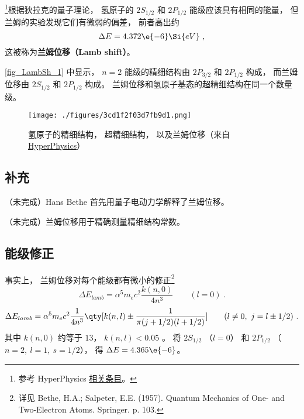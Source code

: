 
\begin{issues}
\issueDraft
\issueMissDepend
\end{issues}


\footnote{参考 HyperPhysics \href{http://hyperphysics.phy-astr.gsu.edu/hbase/quantum/lamb.html}{相关条目}。}根据狄拉克的量子理论， 氢原子的 $2S_{1/2}$ 和 $2P_{1/2}$ 能级应该具有相同的能量， 但兰姆的实验发现它们有微弱的偏差， 前者高出约
\begin{equation}
\Delta E = 4.372\e{-6} \Si{eV}~,
\end{equation}
这被称为\textbf{兰姆位移（Lamb shift）}。

\autoref{fig_LambSh_1} 中显示， $n=2$ 能级的精细结构由 $2P_{3/2}$ 和 $2P_{1/2}$ 构成， 而兰姆位移由 $2S_{1/2}$ 和 $2P_{1/2}$ 构成。 兰姆位移和氢原子基态的超精细结构在同一个数量级。 
\begin{figure}[ht]
\centering
\texttt{[image: ./figures/3cd1f2f03d7fb9d1.png]}
\caption{氢原子的精细结构， 超精细结构， 以及兰姆位移（来自 \href{http://hyperphysics.phy-astr.gsu.edu/hbase/quantum/lamb.html}{HyperPhysics}）} \label{fig_LambSh_1}
\end{figure} %

\subsection{补充}
（未完成）Hans Bethe 首先用量子电动力学解释了兰姆位移。

（未完成）兰姆位移用于精确测量精细结构常数。

\subsection{能级修正}
事实上， 兰姆位移对每个能级都有微小的修正\footnote{详见 Bethe, H.A.; Salpeter, E.E. (1957). Quantum Mechanics of One- and Two-Electron Atoms. Springer. p. 103.}
\begin{equation}
\Delta E_{lamb} = \alpha^5 m_e c^2 \frac{k(n, 0)}{4n^3} \qquad (l = 0)~.
\end{equation}
\begin{equation}
\Delta E_{lamb} =\alpha^5 m_e c^2 \frac{1}{4n^3} \qty[k(n,l) \pm \frac{1}{\pi(j+1/2)(l+1/2)} ] \qquad (l \ne 0,\ j = l \pm 1/2)~.
\end{equation}
其中 $k(n, 0)$ 约等于 $13$， $k(n, l) < 0.05$ 。 将 $2S_{1/2}$ （$l = 0$） 和 $2P_{1/2}$ （$n = 2,\ l = 1,\ s = 1/2$）， 得 $\Delta E = 4.365\e{-6}$。
